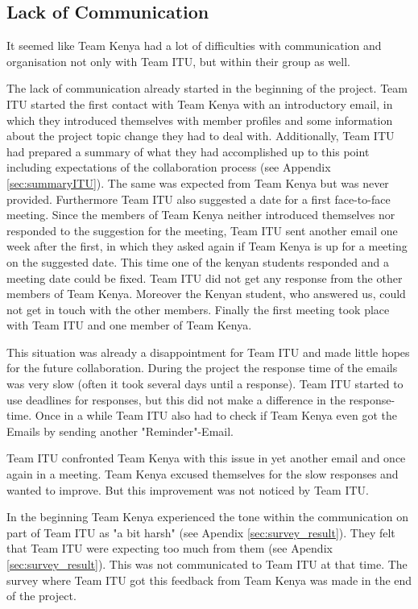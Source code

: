 
\subsection{Lack of Communication}
\label{sec:communication_lack}
It seemed like Team Kenya had a lot of difficulties with communication and organisation not only with Team ITU, but within their group as well.

The lack of communication already started in the beginning of the project. Team ITU started the first contact with Team Kenya with an introductory email, in which they introduced themselves with member profiles and some information about the project topic change they had to deal with. Additionally, Team ITU had prepared a summary of what they had accomplished up to this point including expectations of the collaboration process (see Appendix \ref{sec:summaryITU}). The same was expected from Team Kenya but was never provided. Furthermore Team ITU also suggested a date for a first face-to-face meeting. Since the members of Team Kenya neither introduced themselves nor responded to the suggestion for the meeting, Team ITU sent another email one week after the first, in which they asked again if Team Kenya is up for a meeting on the suggested date. This time one of the kenyan students responded and a meeting date could be fixed. Team ITU did not get any response from the other members of Team Kenya. Moreover the Kenyan student, who answered us, could not get in touch with the other members. Finally the first meeting took place with Team ITU and one member of Team Kenya.

This situation was already a disappointment for Team ITU and made little hopes for the future collaboration. During the project the response time of the emails was very slow (often it took several days until a response). Team ITU started to use deadlines for responses, but this did not make a difference in the response-time. Once in a while Team ITU also had to check if Team Kenya even got the Emails by sending another "Reminder"-Email.

Team ITU confronted Team Kenya with this issue in yet another email and once again in a meeting. Team Kenya excused themselves for the slow responses and wanted to improve. But this improvement was not noticed by Team ITU.

In the beginning Team Kenya experienced the tone within the communication on part of Team ITU  as "a bit harsh" (see Apendix \ref{sec:survey_result}). They felt that Team ITU were expecting too much from them (see Apendix \ref{sec:survey_result}). This was not communicated to Team ITU at that time. The survey where Team ITU got this feedback from Team Kenya was made in the end of the project. 

